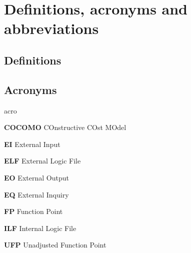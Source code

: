 \section{Definitions, acronyms and abbreviations}

\subsection{Definitions}

\subsection{Acronyms}
	\begin{labeling}{acro}
		\item[\textbf{COCOMO}] COnstructive COst MOdel
		\item[\textbf{EI}] External Input
		\item[\textbf{ELF}] External Logic File
		\item[\textbf{EO}] External Output
		\item[\textbf{EQ}] External Inquiry
		\item[\textbf{FP}] Function Point
		\item[\textbf{ILF}] Internal Logic File
		\item[\textbf{UFP}] Unadjusted Function Point
	\end{labeling}

